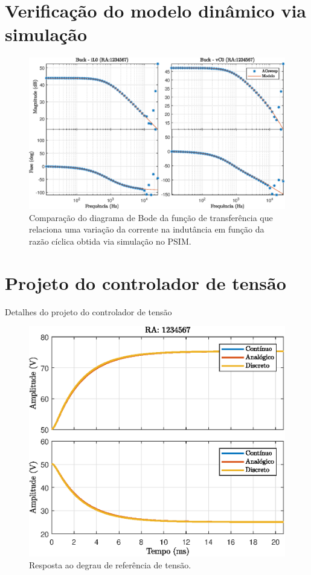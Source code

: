 \section{Verificação do modelo dinâmico via simulação}


\begin{figure}[!ht]
	\centering
	\includegraphics[width=1\linewidth]{Figs/BuckACSweep}
	\caption{Comparação do diagrama de Bode da função de transferência que relaciona uma variação da corrente na indutância em função da razão cíclica obtida via simulação no PSIM.}
	\label{fig:buck-il0}
\end{figure}


\section{Projeto do controlador de tensão}
Detalhes do projeto do controlador de tensão


\begin{figure}[!ht]
	\centering
	\includegraphics[width=0.9\linewidth]{Figs/BuckStepResponse1malhaTodos}
	\caption{Resposta ao degrau de referência de tensão.}
	\label{fig:stepresponse1malha}
\end{figure}

